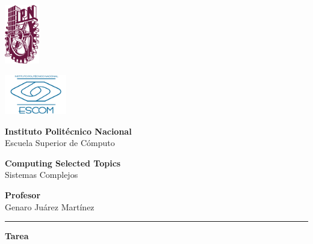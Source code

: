 \documentclass[10pt]{article}
\newcommand{\HRule}{\textcolor{blueTitle}{\rule{\linewidth}{0.5mm}}}
\begin{document}
    \thispagestyle{empty}

    \begin{center}
        \begin{minipage}{0.48\textwidth}
            \begin{flushleft}
                \hspace{1cm}\includegraphics[width=1.5cm]{ipn.png}
            \end{flushleft}
        \end{minipage}
        \begin{minipage} {0.48\textwidth}
            \begin{flushright}
                \includegraphics[width=2.7cm]{escom.png}
            \end{flushright}
        \end{minipage}

        \vspace*{-2cm}

        \LARGE
        \textcolor{blueTitle}{\textbf{Instituto Politécnico Nacional\\}}
        \LARGE
        \textcolor{blueTitle}{Escuela Superior de Cómputo}

        \vspace{2cm}
        
        \Large
        \textbf{Computing Selected Topics} \\
        \vspace{.3cm}
        Sistemas Complejos
        \vspace{1.5cm}
        
        \Large
        \textbf{Profesor} \\
        \vspace{.3cm}
        Genaro Juárez Martínez
        \vspace{1cm}
        
        \HRule
        \vspace{.4cm}
        {\textbf{Tarea} \smallskip
        
}
\end{center}
\end{document}
